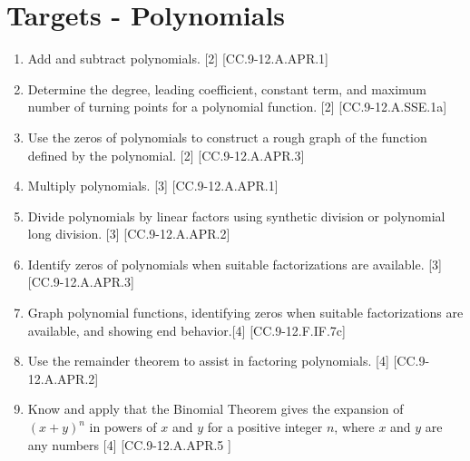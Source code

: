 \documentclass{article}
\begin{document}
\section{Targets - Polynomials}
\begin{enumerate}
	\item Add and subtract polynomials. [2] [CC.9-12.A.APR.1]
	\item Determine the degree, leading coefficient, constant term, and maximum number of turning points for a polynomial function. [2] [CC.9-12.A.SSE.1a]
	\item Use the zeros of polynomials to construct a rough graph of the function defined by the polynomial. [2] [CC.9-12.A.APR.3]
	\item Multiply polynomials. [3] [CC.9-12.A.APR.1]
	\item Divide polynomials by linear factors using synthetic division or polynomial long division. [3] [CC.9-12.A.APR.2]
	\item Identify zeros of polynomials when suitable factorizations are available. [3] [CC.9-12.A.APR.3]
	\item Graph polynomial functions, identifying zeros when suitable factorizations are available, and showing end behavior.[4] [CC.9-12.F.IF.7c]
	\item Use the remainder theorem to assist in factoring polynomials. [4] [CC.9-12.A.APR.2]
	\item Know and apply that the Binomial Theorem gives the expansion of $(x + y)^n$ in powers of $x$ and $y$ for a positive integer $n$, where $x$ and $y$ are any numbers [4] [CC.9-12.A.APR.5 ]
\end{enumerate}
\newpage
\end{document}
